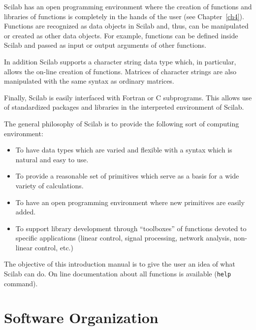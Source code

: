   Scilab has an open programming environment where the
creation of functions and libraries of functions is completely in the
hands of the user (see Chapter~\ref{ch4}).    
Functions are recognized as data objects in Scilab and, thus, can be 
manipulated or created as other data objects.  For example, functions
can be defined inside Scilab and passed as input or output 
arguments of other functions.

In addition Scilab supports a character string data type 
which, in particular, allows the on-line creation of functions.
Matrices of character strings are also manipulated with the same
syntax as ordinary matrices.

        Finally, Scilab is easily interfaced with Fortran or C 
subprograms.  This allows use of standardized 
packages and libraries in the interpreted environment of Scilab.

        The general philosophy of Scilab is to provide the following
sort of computing environment:
\begin{itemize}
   \item To have data types which are varied and flexible with 
a syntax which is natural and easy to use.
   \item To provide a reasonable set of primitives which serve
           as a basis for a wide variety of calculations.
   \item To have an open programming environment where new
           primitives are easily added. 
   \item To support library development through ``toolboxes'' of
         functions devoted to specific
           applications (linear control, signal processing, 
           network analysis, non-linear control, etc.)
\end{itemize}

        The objective of this introduction manual is to give the user 
an idea of what Scilab can do. On line documentation about all
functions is available ({\tt help} command).


\section{Software Organization}

